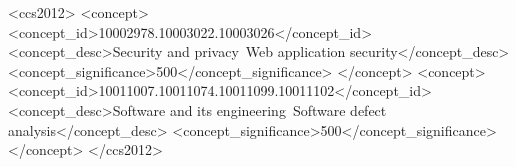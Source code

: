 \documentclass[sigconf]{acmart}
\begin{document}
\begin{CCSXML}
<ccs2012>
<concept>
<concept_id>10002978.10003022.10003026</concept_id>
<concept_desc>Security and privacy~Web application security</concept_desc>
<concept_significance>500</concept_significance>
</concept>
<concept>
<concept_id>10011007.10011074.10011099.10011102</concept_id>
<concept_desc>Software and its engineering~Software defect analysis</concept_desc>
<concept_significance>500</concept_significance>
</concept>
</ccs2012>
\end{CCSXML}



\maketitle


% 










\end{document}

